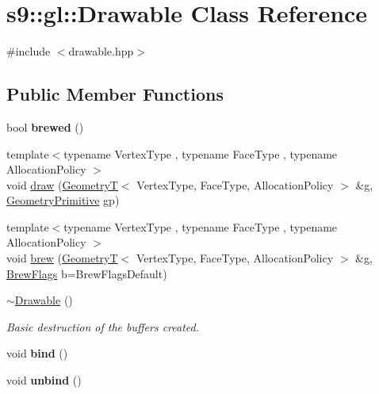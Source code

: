 \hypertarget{classs9_1_1gl_1_1Drawable}{\section{s9\-:\-:gl\-:\-:Drawable Class Reference}
\label{classs9_1_1gl_1_1Drawable}
}


{\ttfamily \#include $<$drawable.\-hpp$>$}

\subsection*{Public Member Functions}
\begin{DoxyCompactItemize}
\item 
\hypertarget{classs9_1_1gl_1_1Drawable_a91d9970a2c83f25640f14119fc620cfc}{bool {\bfseries brewed} ()}\label{classs9_1_1gl_1_1Drawable_a91d9970a2c83f25640f14119fc620cfc}

\item 
{\footnotesize template$<$typename Vertex\-Type , typename Face\-Type , typename Allocation\-Policy $>$ }\\void \hyperlink{classs9_1_1gl_1_1Drawable_a17009f367a17d45ac7f9245b15229c95}{draw} (\hyperlink{classs9_1_1GeometryT}{Geometry\-T}$<$ Vertex\-Type, Face\-Type, Allocation\-Policy $>$ \&g, \hyperlink{namespaces9_ad57d1332f8fd67d23f6a1d3520ab785c}{Geometry\-Primitive} gp)
\item 
{\footnotesize template$<$typename Vertex\-Type , typename Face\-Type , typename Allocation\-Policy $>$ }\\void \hyperlink{classs9_1_1gl_1_1Drawable_ac45a196466c96705860cff9f8898673f}{brew} (\hyperlink{classs9_1_1GeometryT}{Geometry\-T}$<$ Vertex\-Type, Face\-Type, Allocation\-Policy $>$ \&g, \hyperlink{structs9_1_1gl_1_1BrewFlags}{Brew\-Flags} b=Brew\-Flags\-Default)
\item 
\hypertarget{classs9_1_1gl_1_1Drawable_aa06f0608c73e4c7190f17f5934e7bb4c}{\hyperlink{classs9_1_1gl_1_1Drawable_aa06f0608c73e4c7190f17f5934e7bb4c}{$\sim$\-Drawable} ()}\label{classs9_1_1gl_1_1Drawable_aa06f0608c73e4c7190f17f5934e7bb4c}

\begin{DoxyCompactList}\small\item\em Basic destruction of the buffers created. \end{DoxyCompactList}\item 
\hypertarget{classs9_1_1gl_1_1Drawable_ae616cb10c8f213e08914acb760e0a087}{void {\bfseries bind} ()}\label{classs9_1_1gl_1_1Drawable_ae616cb10c8f213e08914acb760e0a087}

\item 
\hypertarget{classs9_1_1gl_1_1Drawable_a6a55c040167e67f808adce694ae425f5}{void {\bfseries unbind} ()}\label{classs9_1_1gl_1_1Drawable_a6a55c040167e67f808adce694ae425f5}

\end{DoxyCompactItemize}
